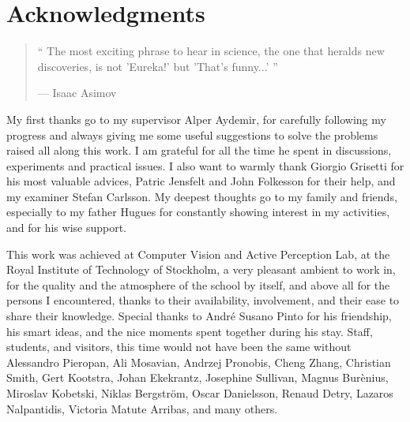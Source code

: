 \chapter{Acknowledgments}

\begin{quote}
`` The most exciting phrase to hear in science, the one that heralds new discoveries, is not 'Eureka!' but 'That's funny...' ''

--- Isaac Asimov
\end{quote}

My first thanks go to my supervisor Alper Aydemir, for carefully following my progress and always giving me some useful suggestions to solve the problems  raised all along this work. I am grateful for all the time he spent in discussions, experiments and practical issues. I also want to warmly thank Giorgio Grisetti for his most valuable advices, Patric Jensfelt and John Folkesson for their help, and my examiner Stefan Carlsson. My deepest thoughts go to my family and friends, especially to my father Hugues for constantly showing interest in my activities, and for his wise support.

This work was achieved at Computer Vision and Active Perception Lab, at the Royal Institute of Technology of Stockholm, a very pleasant ambient to work in, for the quality and the atmosphere of the school by itself, and above all for the persons I encountered, thanks to their availability, involvement, and their ease to share their knowledge. Special thanks to Andr\'{e} Susano Pinto for his friendship, his smart ideas, and the nice moments spent together during his stay. Staff, students, and visitors, this time would not have been the same without Alessandro Pieropan, Ali Mosavian, Andrzej Pronobis, Cheng Zhang, Christian Smith, Gert Kootstra, Johan Ekekrantz, Josephine Sullivan, Magnus Bur\`{e}nius, Miroslav Kobetski, Niklas Bergstr\"{o}m, Oscar Danielsson, Renaud Detry, Lazaros Nalpantidis, Victoria Matute Arribas, and many others.


